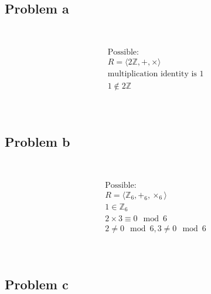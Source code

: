 \documentclass{article}
\begin{document}
~

\subsection*{Problem a}

~

\begin{align*}
    &\text{Possible}:\\
    &R=\langle2\mathbb{Z} ,+,\times\rangle\\
    &\text{multiplication identity is }1\\
    &1\notin 2\mathbb{Z} \\
\end{align*}

~

\subsection*{Problem b}

~

\begin{align*}
    &\text{Possible}:\\
    &R=\langle \mathbb{Z} _6,+_6,\times_6\rangle\\
    &1\in \mathbb{Z} _6\\
    &2\times 3\equiv 0\mod 6\\
    &2\ne 0\mod 6,3\ne0\mod 6\\
\end{align*}

~

\subsection*{Problem c}

~
\end{document}
